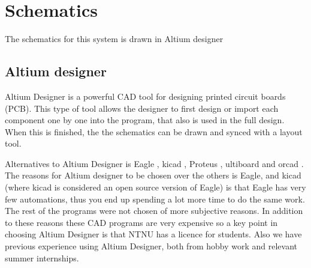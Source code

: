 \section{Schematics}
The schematics for this system is drawn in Altium designer 

\subsection{Altium designer}
\label{altium}
Altium Designer \citep{altium} is a powerful CAD tool for designing printed circuit boards (PCB). This type of tool allows the designer to first design or import each component one by one into the program, that also is used in the full design. When this is finished, the the schematics can be drawn and synced with a layout tool.

Alternatives to Altium Designer is Eagle \citep{eagle}, kicad \citep{kicad}, Proteus \citep{proteus}, ultiboard \citep{ultiboard} and orcad \citep{orcad}. The reasons for Altium designer to be chosen over the others is Eagle, and kicad (where  kicad is considered an open source version of Eagle) is that Eagle has very few automations, thus you end up spending a lot more time to do the same work. The rest of the programs were not chosen of more subjective reasons. In addition to these reasons these CAD programs are very expensive so a key point in choosing Altium Designer is that NTNU has a licence for students. Also we have previous experience using Altium Designer, both from hobby work and relevant summer internships.